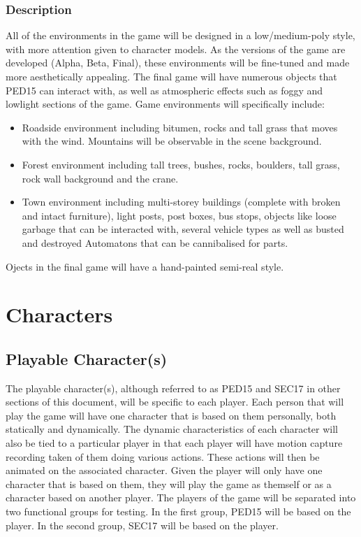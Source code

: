 \documentclass[journal]{IEEEtran}
\begin{document}
\subsubsection{Description}
All of the environments in the game will be designed in a low/medium-poly style, with more attention given to character models. As the versions of the game are developed (Alpha, Beta, Final), these environments will be fine-tuned and made more aesthetically appealing. The final game will have numerous objects that PED15 can interact with, as well as atmospheric effects such as foggy and lowlight sections of the game. Game environments will specifically include:
\begin{itemize}
	\item Roadside environment including bitumen, rocks and tall grass that moves with the wind. Mountains will be observable in the scene background.
	\item Forest environment including tall trees, bushes, rocks, boulders, tall grass, rock wall background and the crane.
	\item Town environment including multi-storey buildings (complete with broken and intact furniture), light posts, post boxes, bus stops, objects like loose garbage that can be interacted with, several vehicle types as well as busted and destroyed Automatons that can be cannibalised for parts.
\end{itemize}
Ojects in the final game will have a hand-painted semi-real style.
\section{Characters}
\subsection{Playable Character(s)}
The playable character(s), although referred to as PED15 and SEC17 in other sections of this document, will be specific to each player. Each person that will play the game will have one character that is based on them personally, both statically and dynamically. The dynamic characteristics of each character will also be tied to a particular player in that each player will have motion capture recording taken of them doing various actions. These actions will then be animated on the associated character.
\linebreak\linebreak
Given the player will only have one character that is based on them, they will play the game as themself or as a character based on another player. The players of the game will be separated into two functional groups for testing. In the first group, PED15 will be based on the player. In the second group, SEC17 will be based on the player.
\end{document}

